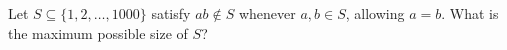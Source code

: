 Let $S\subseteq\{1,2,\ldots,1000\}$ satisfy $ab\notin S$ whenever $a,b\in S$, allowing $a=b$. What is the maximum possible size of $S$?
